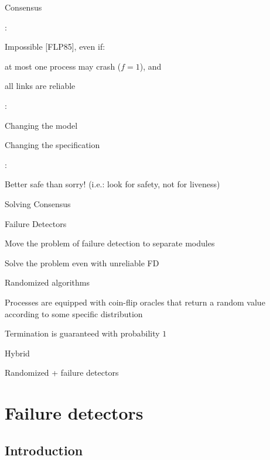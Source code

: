 \begin{frame}{Consensus}
	
:

\BI
\item Impossible [FLP85], even if:
\BI
  \item at most one process may crash ($f = 1$), and
  \item all links are reliable
\EI
\EI

\bigskip
{}:
\BI
  \item \alert<2>{Changing the model}
  \item Changing the specification
\EI

\bigskip
{}:

Better safe than sorry! (i.e.: look for safety, not for liveness)

\end{frame}


\begin{frame}{Solving Consensus}
\BIL
\item \alert{Failure Detectors}
\BI
\item Move the problem of failure detection to separate modules
\item Solve the problem even with unreliable FD
\EI
\item \alert{Randomized algorithms}
\BI
\item Processes are equipped with coin-flip oracles that return a random value according to some specific distribution
\item Termination is guaranteed with probability $1$
\EI
\item \alert{Hybrid}
\BI
\item Randomized + failure detectors
\EI
\EIL
\end{frame}

\section{Failure detectors}

\subsection{Introduction}

